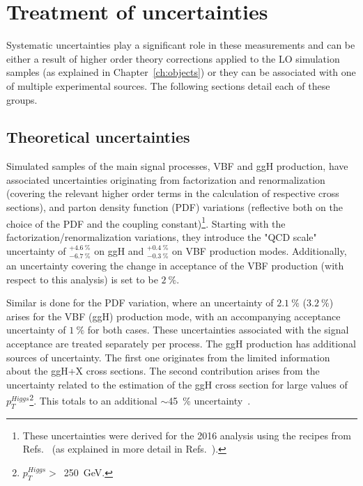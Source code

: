 



\section{Treatment of uncertainties}
\hspace{10pt} Systematic uncertainties play a significant role in these measurements and can be either a result of higher order theory corrections applied to the LO simulation samples (as explained in Chapter~\ref{ch:objects}) or they can be associated with one of multiple experimental sources. The following sections detail each of these groups.

\subsection{Theoretical uncertainties}
\label{sec:theory_uncert}
\hspace{10pt} Simulated samples of the main signal processes, VBF and ggH production, have associated uncertainties originating from factorization and renormalization (covering the relevant higher order terms in the calculation of respective cross sections), and parton density function (PDF) variations (reflective both on the choice of the PDF and the coupling constant)\footnote{These uncertainties were derived for the 2016 analysis using the recipes from Refs.~\cite{yr:handbook4} (as explained in more detail in Refs.~\cite{paper:HIG_17_023,Riccardo}).}. Starting with the factorization/renormalization variations, they introduce the "QCD scale" uncertainty of $^{+4.6~\%}_{-6.7~\%}$ on ggH and $^{+0.4~\%}_{-0.3~\%}$ on VBF production modes. Additionally, an uncertainty covering the change in acceptance of the VBF production (with respect to this analysis) is set to be $2~\%$.

\hspace{10pt} Similar is done for the PDF variation, where an uncertainty of $2.1~\%$ ($3.2~\%$) arises for the VBF (ggH) production mode, with an accompanying acceptance uncertainty of $1~\%$ for both cases. These uncertainties associated with the signal acceptance are treated separately per process. The ggH production has additional sources of uncertainty. The first one originates from the limited information about the ggH+X cross sections. The second contribution arises from the uncertainty related to the estimation of the ggH cross section for large values of $p_T^{Higgs}$\footnote{$p_T^{Higgs}>$~250~GeV.}. This totals to an additional $\sim$45~\% uncertainty~\cite{paper:HIG_17_023,Riccardo}. 

